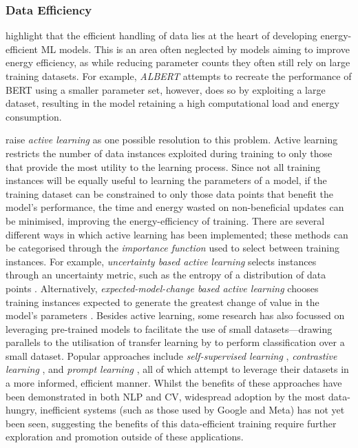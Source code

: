 \documentclass[a4paper, 12pt]{article}
\begin{document}
    \subsubsection{Data Efficiency}

     highlight that the efficient handling of data lies at the heart of developing energy-efficient ML models. This is an area often neglected by models aiming to improve energy efficiency, as while reducing parameter counts they often still rely on large training datasets. For example, \emph{ALBERT} \cite{lan-2020} attempts to recreate the performance of BERT using a smaller parameter set, however, does so by exploiting a large dataset, resulting in the model retaining a high computational load and energy consumption. 

     raise \emph{active learning} as one possible resolution to this problem. Active learning restricts the number of data instances exploited during training to only those that provide the most utility to the learning process. Since not all training instances will be equally useful to learning the parameters of a model, if the training dataset can be constrained to only those data points that benefit the model's performance, the time and energy wasted on non-beneficial updates can be minimised, improving the energy-efficiency of training. There are several different ways in which active learning has been implemented; these methods can be categorised through the \emph{importance function} used to select between training instances. For example, \emph{uncertainty based active learning} selects instances through an uncertainty metric, such as the entropy of a distribution of data points \cite{joshi-2009}. Alternatively, \emph{expected-model-change based active learning} chooses training instances expected to generate the greatest change of value in the model's parameters \cite{freytag-2014}. Besides active learning, some research has also focussed on leveraging pre-trained models to facilitate the use of small datasets---drawing parallels to the utilisation of transfer learning by  to perform classification over a small dataset. Popular approaches include \emph{self-supervised learning} \cite{jing-2019}, \emph{contrastive learning} \cite{chen-2020}, and \emph{prompt learning} \cite{liu-2021b}, all of which attempt to leverage their datasets in a more informed, efficient manner. Whilst the benefits of these approaches have been demonstrated in both NLP and CV, widespread adoption by the most data-hungry, inefficient systems (such as those used by Google and Meta) has not yet been seen, suggesting the benefits of this data-efficient training require further exploration and promotion outside of these applications.
\end{document}
